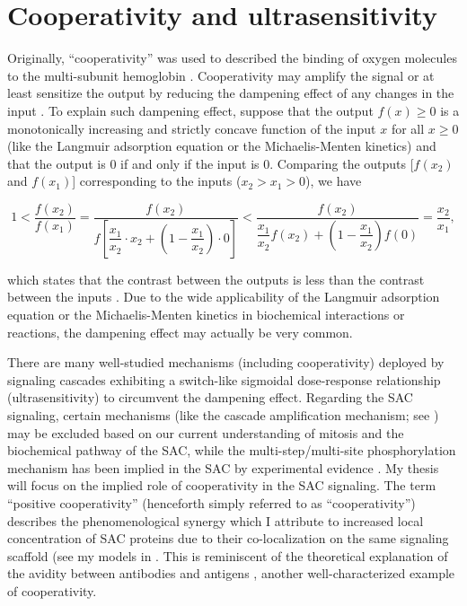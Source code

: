\section{Cooperativity and ultrasensitivity}

Originally, ``cooperativity'' was used to described the binding of oxygen molecules to the multi-subunit hemoglobin \cite{KNF, MWC}. Cooperativity may amplify the signal or at least sensitize the output by reducing the dampening effect of any changes in the input \cite{CooperativityQA}. To explain such dampening effect, suppose that the output $f(x) \geq 0$ is a monotonically increasing and strictly concave function of the input $x$ for all $x \geq 0$ (like the Langmuir adsorption equation or the Michaelis-Menten kinetics) and that the output is 0 if and only if the input is 0. Comparing the outputs [$f(x_2)$ and $f(x_1)$] corresponding to the inputs ($x_2 > x_1 > 0$), we have

\begin{equation*}
    1 < \dfrac{f(x_2)}{f(x_1)} = \dfrac{f(x_2)}{f[\dfrac{x_1}{x_2} \cdot x_2 + (1-\dfrac{x_1}{x_2}) \cdot 0]} < \dfrac{f(x_2)}{\dfrac{x_1}{x_2}f(x_2) + (1-\dfrac{x_1}{x_2})f(0)} = \dfrac{x_2}{x_1},
\end{equation*}

\noindent which states that the contrast between the outputs is less than the contrast between the inputs \cite{InhibitorUltrasensitivity}. Due to the wide applicability of the Langmuir adsorption equation or the Michaelis-Menten kinetics in biochemical interactions or reactions, the dampening effect may actually be very common.

There are many well-studied mechanisms (including cooperativity) deployed by signaling cascades exhibiting a switch-like sigmoidal dose-response relationship (ultrasensitivity) to circumvent the dampening effect. Regarding the SAC signaling, certain mechanisms (like the cascade amplification mechanism; see ) may be excluded based on our current understanding of mitosis and the biochemical pathway of the SAC, while the multi-step/multi-site phosphorylation mechanism has been implied in the SAC by experimental evidence \cite{MultistepUltrasensitivity, Ji2017eLife}. My thesis will focus on the implied role of cooperativity in the SAC signaling. The term ``positive cooperativity'' (henceforth simply referred to as ``cooperativity'') describes the phenomenological synergy which I attribute to increased local concentration of SAC proteins due to their co-localization on the same signaling scaffold (see my models in . This is reminiscent of the theoretical explanation of the avidity between antibodies and antigens \cite{AvidityMath}, another well-characterized example of cooperativity.

